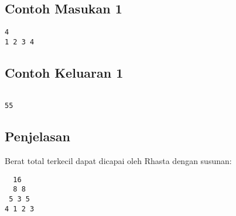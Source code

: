 \documentclass{article}
\begin{document}
\begin{multicols}{2}
\subsection*{Contoh Masukan 1}
\begin{lstlisting}
4
1 2 3 4
\end{lstlisting}
\null
\columnbreak
\subsection*{Contoh Keluaran 1}
\begin{lstlisting}

55

\end{lstlisting}
\vfill
\null
\end{multicols}

\subsection*{Penjelasan}
Berat total terkecil dapat dicapai oleh Rhasta dengan susunan:
\begin{lstlisting}
  16
  8 8
 5 3 5
4 1 2 3
\end{lstlisting}
\end{document}
